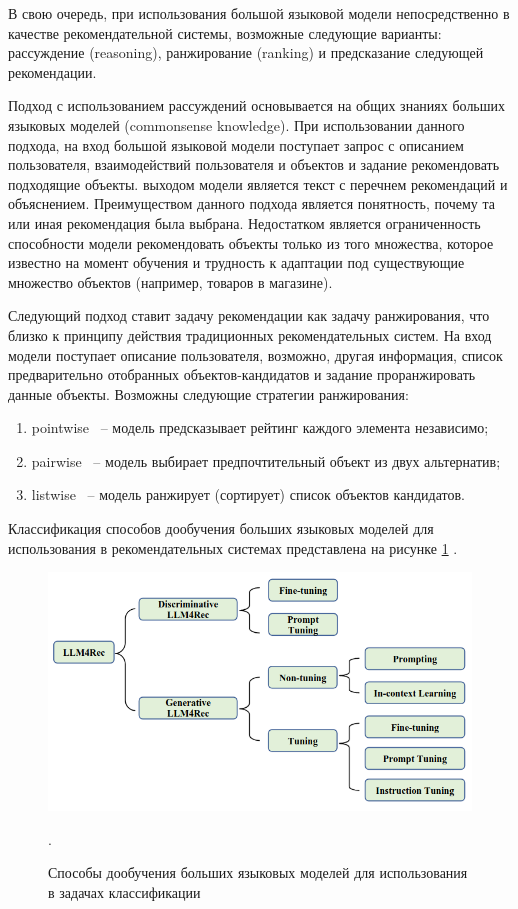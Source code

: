 В свою очередь, при использования большой языковой модели непосредственно в качестве рекомендательной системы, возможные следующие варианты: рассуждение (reasoning), ранжирование (ranking) и предсказание следующей рекомендации.

Подход с использованием рассуждений основывается на общих знаниях больших языковых моделей (commonsense knowledge). При использовании данного подхода, на вход большой языковой модели поступает запрос с описанием пользователя, взаимодействий пользователя и объектов и задание рекомендовать подходящие объекты. выходом модели является текст с перечнем рекомендаций и объяснением. Преимуществом данного подхода является понятность, почему та или иная рекомендация была выбрана. Недостатком является ограниченность способности модели рекомендовать объекты только из того множества, которое известно на момент обучения и трудность к адаптации под существующие множество объектов (например, товаров в магазине).

Следующий подход ставит задачу рекомендации как задачу ранжирования, что близко к принципу действия традиционных рекомендательных систем. На вход модели поступает описание пользователя, возможно, другая информация, список предварительно отобранных объектов-кандидатов и задание проранжировать данные объекты. Возможны следующие стратегии ранжирования:
\begin{enumerate}
    \item pointwise ~-- модель предсказывает рейтинг каждого элемента независимо;
    \item pairwise ~-- модель выбирает предпочтительный объект из двух альтернатив;
    \item listwise ~-- модель ранжирует (сортирует) список объектов кандидатов.
\end{enumerate}

Классификация способов дообучения больших языковых моделей для использования в рекомендательных системах представлена на рисунке \ref{img:llm_rs_classification} \cite{llm_rs_survey}.

\begin{figure}[h]
    \centering
    \includegraphics[width=\linewidth]{../images/llm_rs_classification.png}
    \caption{Способы дообучения больших языковых моделей для использования в задачах классификации \cite{llm_rs_survey}}.
    \label{img:llm_rs_classification}
\end{figure}

